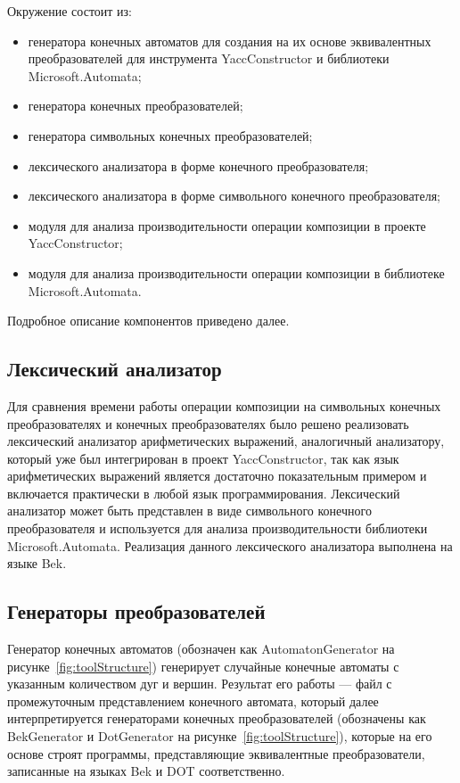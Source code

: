 Окружение состоит из:
\begin{itemize}
\item генератора конечных автоматов для создания на их основе эквивалентных преобразователей для инструмента YaccConstructor и библиотеки Microsoft.Automata;
\item генератора конечных преобразователей;
\item генератора символьных конечных преобразователей;
\item лексического анализатора в форме конечного преобразователя;
\item лексического анализатора в форме символьного конечного преобразователя;
\item модуля для анализа производительности операции композиции в проекте YaccConstructor;
\item модуля для анализа производительности операции композиции в библиотеке Microsoft.Automata.
\end{itemize}
Подробное описание компонентов приведено далее.

\subsection{Лексический анализатор}
Для сравнения времени работы операции композиции на символьных конечных преобразователях и конечных преобразователях было решено реализовать лексический анализатор арифметических выражений, аналогичный анализатору, который уже был интегрирован в проект YaccConstructor, так как язык арифметических выражений является достаточно показательным примером и включается практически в любой язык программирования.  Лексический анализатор может быть представлен в виде символьного конечного преобразователя и используется для анализа производительности библиотеки Microsoft.Automata. Реализация данного лексического анализатора выполнена на языке Bek.

\subsection{Генераторы преобразователей}
Генератор конечных автоматов (обозначен как AutomatonGenerator на рисунке~\ref{fig:toolStructure}) генерирует случайные конечные автоматы с указанным количеством дуг и вершин. Результат его работы --- файл с промежуточным представлением конечного автомата, который далее интерпретируется генераторами конечных преобразователей (обозначены как BekGenerator и DotGenerator на рисунке~\ref{fig:toolStructure}), которые на его основе строят программы, представляющие эквивалентные преобразователи, записанные на языках Bek и DOT соответственно. 

